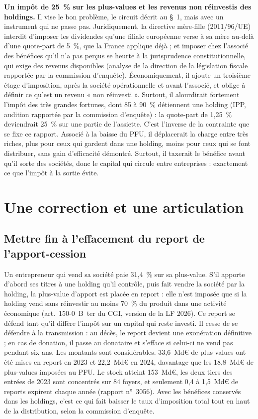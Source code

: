 \documentclass[11pt,a4paper]{article}
\begin{document}
\textbf{Un impôt de 25~\% sur les plus-values et les revenus non réinvestis des holdings.} Il vise le bon
problème, le circuit décrit au §~1, mais avec un instrument qui ne passe pas. Juridiquement, la directive
mère-fille (2011/96/UE) interdit d'imposer les dividendes qu'une filiale européenne verse à sa mère au-delà
d'une quote-part de 5~\%, que la France applique déjà ; et imposer chez l'associé des bénéfices qu'il n'a pas
perçus se heurte à la jurisprudence constitutionnelle, qui exige des revenus disponibles (analyse de la
direction de la législation fiscale rapportée par la commission d'enquête). Économiquement, il ajoute un
troisième étage d'imposition, après la société opérationnelle et avant l'associé, et oblige à définir ce
qu'est un revenu « non réinvesti ». Surtout, il alourdirait fortement l'impôt des très grandes fortunes, dont
85 à 90~\% détiennent une holding (IPP, audition rapportée par la commission d'enquête) : la quote-part de 1,25~\% deviendrait 25~\% sur une partie de
l'assiette. C'est l'inverse de la contrainte que se fixe ce rapport. Associé à la baisse du PFU, il déplacerait
la charge entre très riches, plus pour ceux qui gardent dans une holding, moins pour ceux qui se font
distribuer, sans gain d'efficacité démontré. Surtout, il taxerait le bénéfice avant qu'il sorte des sociétés, donc le
capital qui circule entre entreprises : exactement ce que l'impôt à la sortie évite.

\section{Une correction et une articulation}

\subsection*{Mettre fin à l'effacement du report de l'apport-cession}

Un entrepreneur qui vend sa société paie 31,4~\% sur sa plus-value. S'il apporte d'abord ses titres à une
holding qu'il contrôle, puis fait vendre la société par la holding, la plus-value d'apport est placée en
report : elle n'est imposée que si la holding vend sans réinvestir au moins 70~\% du produit dans une activité
économique (art.~150-0~B~ter du CGI, version de la LF 2026). Ce report se défend tant qu'il diffère l'impôt
sur un capital qui reste investi. Il cesse de se défendre à la transmission : au décès, le report devient une
exonération définitive ; en cas de donation, il passe au donataire et s'efface si celui-ci ne vend pas
pendant six ans. Les montants sont considérables. 33,6~Md€ de plus-values ont été mises en report en 2023 et
22,2~Md€ en 2024, davantage que les 18,8~Md€ de plus-values imposées au PFU. Le stock atteint 153~Md€, les
deux tiers des entrées de 2023 sont concentrés sur 84 foyers, et seulement 0,4 à 1,5~Md€ de reports expirent
chaque année (rapport n°~3056). Avec les bénéfices conservés dans les holdings, c'est ce qui fait baisser le
taux d'imposition total tout en haut de la distribution, selon la commission d'enquête.
\end{document}
